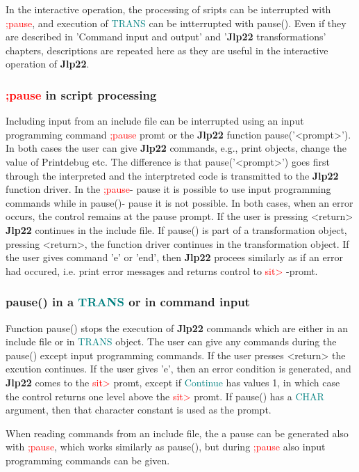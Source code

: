 {\begin{itemize}
\begin{itemize}
In the interactive operation, the processing of sripts can be interrupted with \textcolor{Red}{;pause}, and 
execution of \textcolor{teal}{TRANS} can be intterrupted with \textcolor{VioletRed}{pause}(). Even if they are described in 
'Command input and output' and '\textbf{Jlp22} transformations' chapters, descriptions 
are repeated here as they are useful in the interactive operation of \textbf{Jlp22}. 
\subsubsection{\textcolor{Red}{;pause} in script processing} 
\label{inpupause} 
Including input from an include file can be interrupted using an input programming 
command \textcolor{Red}{;pause} promt or the \textbf{Jlp22} function \textcolor{VioletRed}{pause}('<prompt>'). In both cases 
the user can give \textbf{Jlp22} commands, e.g., print objects, change the value of Printdebug etc. 
The difference is that  \textcolor{VioletRed}{pause}('<prompt>') goes first through the interpreted and the interptreted 
code is transmitted to the \textbf{Jlp22} function driver. In the \textcolor{Red}{;pause}- pause it is possible to 
use input programming commands while in \textcolor{VioletRed}{pause}()- pause it is not possible. In both cases, when 
an error occurs, the control remains at the pause prompt. If the user is pressing 
<return> \textbf{Jlp22} continues in the include file. If \textcolor{VioletRed}{pause}() is part of a transformation object, 
pressing <return>, the function driver continues in the transformation object. 
If the user gives command 'e' or 'end', then \textbf{Jlp22} procees similarly as if an error had occured, 
i.e. print error messages and returns control to \textcolor{Red}{sit>} -promt. 
\subsubsection{\textcolor{VioletRed}{pause}() in a \textcolor{teal}{TRANS} or in command input} 
\label{pause} 
Function \textcolor{VioletRed}{pause}() stops the execution of \textbf{Jlp22} commands which are either in an 
include file or in \textcolor{teal}{TRANS} object. The user can give any commands during the 
\textcolor{VioletRed}{pause}() except input programming commands. 
If the user presses <return> the excution continues. If the user gives 'e', then 
an error condition is generated, and \textbf{Jlp22} comes to the \textcolor{Red}{sit>} promt, except 
if \textcolor{teal}{Continue} has values 1, in which case the control returns one level above 
the \textcolor{Red}{sit>} promt. 
If \textcolor{VioletRed}{pause}()  has a \textcolor{teal}{CHAR} argument, then that character constant is used as 
the prompt. 
\begin{note} 
When reading commands from an include file, the a pause can be generated also 
with \textcolor{Red}{;pause}, which works similarly as \textcolor{VioletRed}{pause}(), but during \textcolor{Red}{;pause} also input programming 
commands can be given. 
\end{note} 

\end{itemize}
\end{itemize}}
